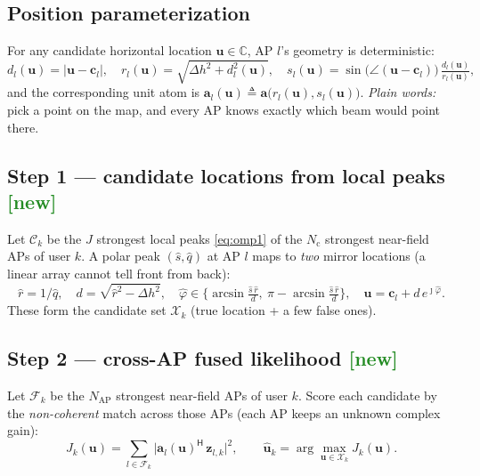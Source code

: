 \documentclass[11pt]{article}
\newcommand{\C}{\mathbb{C}}
\newcommand{\herm}{^{\mathsf{H}}}
\newcommand{\abs}[1]{\left|#1\right|}
\newcommand{\vz}{\mathbf{z}}
\newcommand{\va}{\mathbf{a}}
\begin{document}
\subsection{Position parameterization}
For any candidate horizontal location $\mathbf u\in\C$, AP $l$'s geometry is deterministic:
\begin{equation}
d_l(\mathbf u)=\abs{\mathbf u-\mathbf c_l},\quad
r_l(\mathbf u)=\sqrt{\Delta h^2+d_l^2(\mathbf u)},\quad
s_l(\mathbf u)=\sin\!\big(\angle(\mathbf u-\mathbf c_l)\big)\,\tfrac{d_l(\mathbf u)}{r_l(\mathbf u)},
\label{eq:geo}
\end{equation}
and the corresponding unit atom is $\va_l(\mathbf u)\triangleq\va\big(r_l(\mathbf u),s_l(\mathbf u)\big)$.
\emph{Plain words:} pick a point on the map, and every AP knows exactly which beam would point there.

\subsection{Step 1 --- candidate locations from local peaks \textcolor{ForestGreen}{[new]}}
Let $\mathcal{C}_k$ be the $J$ strongest local peaks \eqref{eq:omp1} of the $N_{\mathrm c}$ strongest
near-field APs of user $k$. A polar peak $(\hat s,\hat q)$ at AP $l$ maps to \emph{two} mirror
locations (a linear array cannot tell front from back):
\begin{equation}
\hat r=1/\hat q,\quad d=\sqrt{\hat r^2-\Delta h^2},\quad
\hat\varphi\in\Big\{\arcsin\!\tfrac{\hat s\,\hat r}{d},\ \pi-\arcsin\!\tfrac{\hat s\,\hat r}{d}\Big\},
\quad \mathbf u=\mathbf c_l+d\,e^{\jmath\hat\varphi}.
\label{eq:cand}
\end{equation}
These form the candidate set $\mathcal{X}_k$ (true location + a few false ones).

\subsection{Step 2 --- cross-AP fused likelihood \textcolor{ForestGreen}{[new]}}
Let $\mathcal{F}_k$ be the $N_{\mathrm{AP}}$ strongest near-field APs of user $k$. Score each
candidate by the \emph{non-coherent} match across those APs (each AP keeps an unknown complex gain):
\begin{equation}
\boxed{\;
J_k(\mathbf u)=\sum_{l\in\mathcal{F}_k}\big|\va_l(\mathbf u)\herm\,\vz_{l,k}\big|^2,
\qquad
\hat{\mathbf u}_k=\arg\max_{\mathbf u\in\mathcal{X}_k} J_k(\mathbf u).\;}
\label{eq:fuse}
\end{equation}
\end{document}
